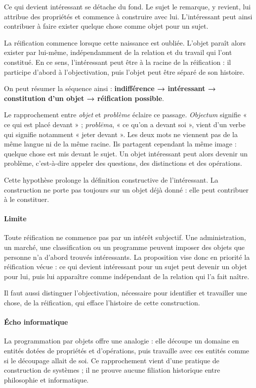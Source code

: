 \documentclass[10pt,a4paper]{article}
\begin{document}
Ce qui devient intéressant se détache du fond. Le sujet le remarque, y revient, lui attribue des propriétés et commence à construire avec lui. L'intéressant peut ainsi contribuer à faire exister quelque chose comme objet pour un sujet.

La réification commence lorsque cette naissance est oubliée. L'objet paraît alors exister par lui-même, indépendamment de la relation et du travail qui l'ont constitué. En ce sens, l'intéressant peut être à la racine de la réification : il participe d'abord à l'objectivation, puis l'objet peut être séparé de son histoire.

On peut résumer la séquence ainsi : \textbf{indifférence → intéressant → constitution d'un objet → réification possible}.

Le rapprochement entre \emph{objet} et \emph{problème} éclaire ce passage. \emph{Objectum} signifie « ce qui est placé devant » ; \emph{problēma}, « ce qu'on a devant soi », vient d'un verbe qui signifie notamment « jeter devant ». Les deux mots ne viennent pas de la même langue ni de la même racine. Ils partagent cependant la même image : quelque chose est mis devant le sujet. Un objet intéressant peut alors devenir un problème, c'est-à-dire appeler des questions, des distinctions et des opérations.

Cette hypothèse prolonge la définition constructive de l'intéressant. La construction ne porte pas toujours sur un objet déjà donné : elle peut contribuer à le constituer.

\paragraph{Limite}
Toute réification ne commence pas par un intérêt subjectif. Une administration, un marché, une classification ou un programme peuvent imposer des objets que personne n'a d'abord trouvés intéressants. La proposition vise donc en priorité la réification vécue : ce qui devient intéressant pour un sujet peut devenir un objet pour lui, puis lui apparaître comme indépendant de la relation qui l'a fait naître.

Il faut aussi distinguer l'objectivation, nécessaire pour identifier et travailler une chose, de la réification, qui efface l'histoire de cette construction.

\paragraph{Écho informatique}
La programmation par objets offre une analogie : elle découpe un domaine en entités dotées de propriétés et d'opérations, puis travaille avec ces entités comme si le découpage allait de soi. Ce rapprochement vient d'une pratique de construction de systèmes ; il ne prouve aucune filiation historique entre philosophie et informatique.
\end{document}
